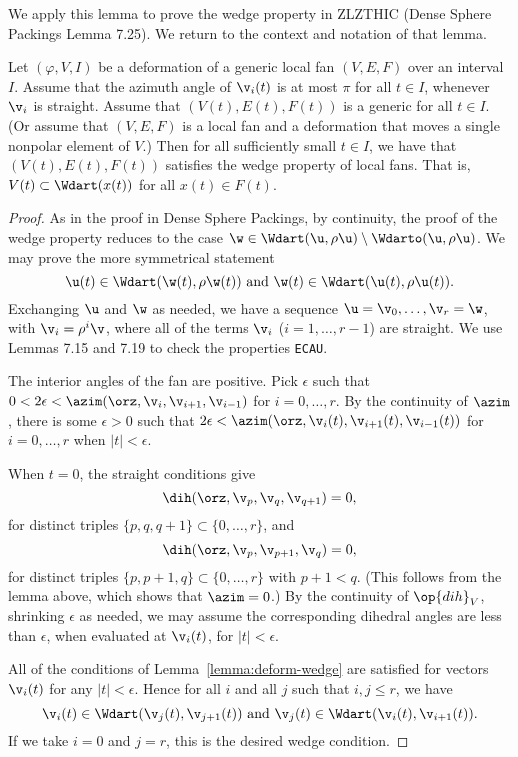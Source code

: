 We apply this lemma to prove the wedge property in ZLZTHIC (Dense Sphere Packings Lemma 7.25).
We return to the context and notation of that lemma.

\begin{lemma}  Let $(\varphi,V,I)$ be a deformation of a generic local fan $(V,E,F)$ over an
interval $I$.  Assume that the azimuth angle of $\v_i(t)$ is at most $\pi$ for all  $t\in I$,
whenever $\v_i$ is straight.  Assume that $(V(t),E(t),F(t))$ is a generic for all $t\in I$.  (Or assume
that $(V,E,F)$ is a local fan and a deformation that moves a single nonpolar element of $V$.)
Then for all sufficiently small $t\in I$,  we have that $(V(t),E(t),F(t))$ satisfies the wedge property
of local fans.  That is, $V(t)\subset \Wdart(x(t))$ for all $x(t)\in F(t)$.
\end{lemma}

\begin{proof}
As in the proof in Dense Sphere Packings,  by continuity,
the proof of the wedge property reduces to the case $\w\in \Wdart(\u,\rho\u)\setminus \Wdarto(\u,\rho\u)$.
We may prove the more symmetrical statement
\[
\u(t)\in \Wdart(\w(t),\rho\w(t)) \text{ and } \w(t) \in \Wdart(\u(t),\rho\u(t)).
\]
Exchanging $\u$ and $\w$ as needed, 
we have a sequence $\u=\v_0,\ldots,\v_r =\w$, with $\v_i =\rho^i\v$,
where all of the terms $\v_i$ ($i=1,\ldots,r-1$) are straight.  We use Lemmas 7.15 and 7.19
to check the properties {\tt ECAU}.

The interior angles of the fan are positive.
Pick $\epsilon$ such that  $0 < 2\epsilon < \azim(\orz,\v_i,\v_{i+1},\v_{i-1})$ for $i=0,\ldots,r$.
By the continuity of $\azim$, there is some $\epsilon > 0$ such that
$2\epsilon < \azim(\orz,\v_i(t),\v_{i+1}(t),\v_{i-1}(t))$ for $i=0,\ldots,r$ when $|t|<\epsilon$.

When $t=0$, the straight conditions give
\[
\dih(\orz,\v_p,\v_q,\v_{q+1}) = 0,
\]
for distinct triples $\{p,q,q+1\} \subset \{0,\ldots,r\}$,
and
\[
\dih(\orz,\v_p,\v_{p+1},\v_q)=0,
\]
for distinct triples $\{p,p+1,q\}\subset \{0,\ldots,r\}$ with $p+1 < q$.  (This follows from
the lemma above, which shows that $\azim  = 0$.)
By the continuity of $\op{dih}_V$, 
shrinking $\epsilon$ as needed, we may assume the corresponding
dihedral angles are less than $\epsilon$, when evaluated at $\v_i(t)$, for $|t|<\epsilon$.

All of the conditions of Lemma~\ref{lemma:deform-wedge} are satisfied for
vectors $\v_i(t)$ for any $|t|<\epsilon$.  Hence for all $i$ and all $j$ such that $i,j\le r$, we have
\[
\v_i(t) \in \Wdart(\v_{j}(t),\v_{j+1}(t)) \text{ and } \v_j(t) \in \Wdart(\v_{i}(t),\v_{i+1}(t)).
\]
If we take $i=0$ and $j=r$, this is the desired wedge condition.
\end{proof}





